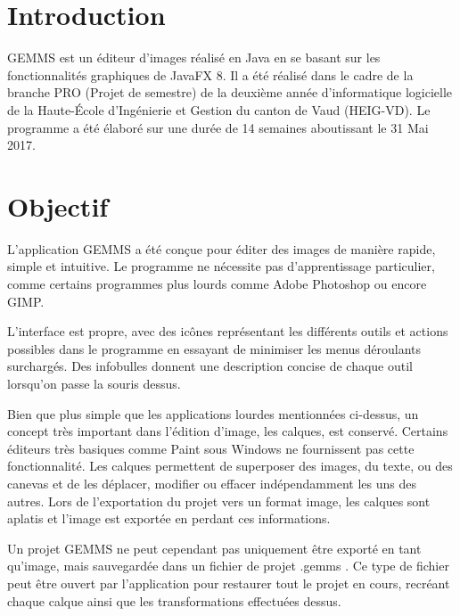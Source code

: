 \section{Introduction}
GEMMS est un éditeur d'images réalisé en Java en se basant sur les fonctionnalités graphiques de JavaFX 8. Il a été réalisé dans le cadre de la branche PRO (Projet de semestre) de la deuxième année d'informatique logicielle de la Haute-École d'Ingénierie et Gestion du canton de Vaud (HEIG-VD). 
Le programme a été élaboré sur une durée de 14 semaines aboutissant le 31 Mai 2017.

\section{Objectif}
L'application GEMMS a été conçue pour éditer des images de manière rapide, simple et intuitive. Le programme ne nécessite pas d'apprentissage particulier, comme certains programmes plus lourds comme Adobe Photoshop ou encore GIMP.

L'interface est propre, avec des icônes représentant les différents outils et actions possibles dans le programme en essayant de minimiser les menus déroulants surchargés. Des infobulles donnent une description concise de chaque outil lorsqu'on passe la souris dessus.

Bien que plus simple que les applications lourdes mentionnées ci-dessus, un concept très important dans l'édition d'image, les calques, est conservé. Certains éditeurs très basiques comme Paint sous Windows ne fournissent pas cette fonctionnalité. Les calques permettent de superposer des images, du texte, ou des canevas et de les déplacer, modifier ou effacer indépendamment les uns des autres. Lors de l'exportation du projet vers un format image, les calques sont aplatis et l'image est exportée en perdant ces informations.

Un projet GEMMS ne peut cependant pas uniquement être exporté en tant qu'image, mais sauvegardée dans un fichier de projet \og.gemms \fg{}. Ce type de fichier peut être ouvert par l'application pour restaurer tout le projet en cours, recréant chaque calque ainsi que les transformations effectuées dessus.

